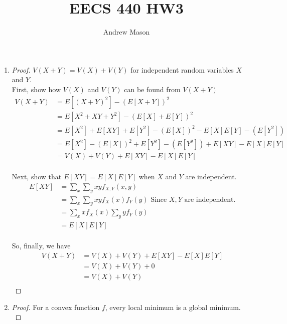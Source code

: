 \documentclass[12pt]{article}
\author{Andrew Mason}
\title{EECS 440 HW3}
\begin{document}
\maketitle

\begin{enumerate}
  \item
    \begin{proof} $V(X+Y) = V(X) + V(Y)$ for independent random variables $X$ and $Y$.\\

      First, show how $V(X)$ and $V(Y)$ can be found from $V(X+Y)$
      \begin{equation}
        \begin{split}
          V(X+Y) &= E[(X+Y)^2] - (E[X+Y])^2 \\
          &= E[X^2 + XY + Y^2] - (E[X] + E[Y])^2 \\
          &= E[X^2] + E[XY] + E[Y^2] - (E[X])^2 - E[X]E[Y] - (E[Y^2]) \\
          &= E[X^2] - (E[X])^2 + E[Y^2] - (E[Y^2]) + E[XY] - E[X]E[Y] \\
          &= V(X) + V(Y) + E[XY] - E[X]E[Y] \\
        \end{split}
      \end{equation}

      Next, show that $E[XY] = E[X]E[Y]$ when $X$ and $Y$ are independent.
      \begin{equation}
        \begin{split}
        E[XY] &= \sum_{x}\sum_{y}xyf_{X,Y}(x,y) \\
        &= \sum_{x}\sum_{y}xyf_X(x)f_Y(y)\text{ Since $X,Y$ are independent.} \\
        &= \sum_{x}xf_X(x)\sum_{y}yf_Y(y) \\
        &= E[X]E[Y] \\
        \end{split}
      \end{equation}

      So, finally, we have
      \begin{equation}
        \begin{split}
          V(X+Y) &= V(X) + V(Y) + E[XY] - E[X]E[Y] \\
          &= V(X) + V(Y) + 0 \\
          &= V(X) + V(Y) \\
        \end{split}
      \end{equation}
    \end{proof}
  \item
    \begin{proof} For a convex function $f$, every local minimum is a global minimum.\\


\end{proof}
\end{enumerate}
\end{document}

